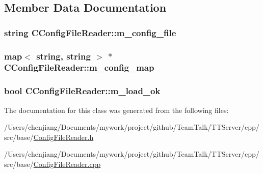 \subsection{Member Data Documentation}
\hypertarget{class_c_config_file_reader_a6aca4d63a315b0fad0b96e1d013d486e}{}
\subsubsection[{m\+\_\+config\+\_\+file}]{\setlength{\rightskip}{0pt plus 5cm}string C\+Config\+File\+Reader\+::m\+\_\+config\+\_\+file\hspace{0.3cm}{\ttfamily [private]}}\label{class_c_config_file_reader_a6aca4d63a315b0fad0b96e1d013d486e}
\hypertarget{class_c_config_file_reader_aa49348ac308eae6be2d2c7e0d2ab21bf}{}
\subsubsection[{m\+\_\+config\+\_\+map}]{\setlength{\rightskip}{0pt plus 5cm}map$<$ string, string $>$ $\ast$ C\+Config\+File\+Reader\+::m\+\_\+config\+\_\+map\hspace{0.3cm}{\ttfamily [private]}}\label{class_c_config_file_reader_aa49348ac308eae6be2d2c7e0d2ab21bf}
\hypertarget{class_c_config_file_reader_aece2f8ddd83db181c2b2c50ede873483}{}
\subsubsection[{m\+\_\+load\+\_\+ok}]{\setlength{\rightskip}{0pt plus 5cm}bool C\+Config\+File\+Reader\+::m\+\_\+load\+\_\+ok\hspace{0.3cm}{\ttfamily [private]}}\label{class_c_config_file_reader_aece2f8ddd83db181c2b2c50ede873483}


The documentation for this class was generated from the following files\+:\begin{DoxyCompactItemize}
\item 
/\+Users/chenjiang/\+Documents/mywork/project/github/\+Team\+Talk/\+T\+T\+Server/cpp/src/base/\hyperlink{base_2_config_file_reader_8h}{Config\+File\+Reader.\+h}\item 
/\+Users/chenjiang/\+Documents/mywork/project/github/\+Team\+Talk/\+T\+T\+Server/cpp/src/base/\hyperlink{base_2_config_file_reader_8cpp}{Config\+File\+Reader.\+cpp}\end{DoxyCompactItemize}
